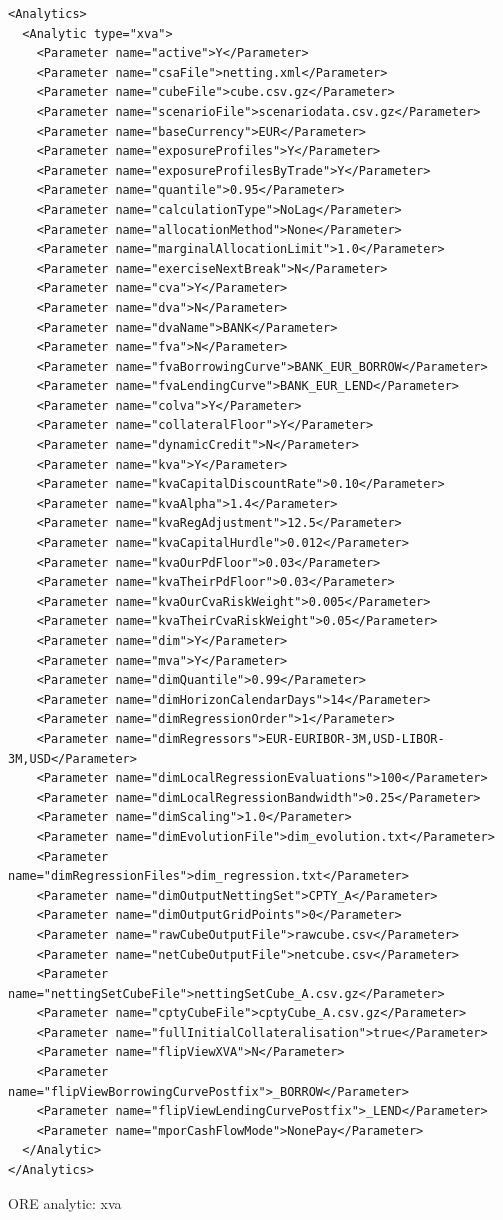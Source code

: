 \documentclass[12pt, a4paper]{article}
\begin{document}
\begin{listing}[H]
\begin{verbatim}
<Analytics>
  <Analytic type="xva">
    <Parameter name="active">Y</Parameter>
    <Parameter name="csaFile">netting.xml</Parameter>
    <Parameter name="cubeFile">cube.csv.gz</Parameter>
    <Parameter name="scenarioFile">scenariodata.csv.gz</Parameter>
    <Parameter name="baseCurrency">EUR</Parameter>
    <Parameter name="exposureProfiles">Y</Parameter>
    <Parameter name="exposureProfilesByTrade">Y</Parameter>
    <Parameter name="quantile">0.95</Parameter>
    <Parameter name="calculationType">NoLag</Parameter>      
    <Parameter name="allocationMethod">None</Parameter>    
    <Parameter name="marginalAllocationLimit">1.0</Parameter>
    <Parameter name="exerciseNextBreak">N</Parameter>
    <Parameter name="cva">Y</Parameter>
    <Parameter name="dva">N</Parameter>
    <Parameter name="dvaName">BANK</Parameter>
    <Parameter name="fva">N</Parameter>
    <Parameter name="fvaBorrowingCurve">BANK_EUR_BORROW</Parameter>
    <Parameter name="fvaLendingCurve">BANK_EUR_LEND</Parameter>
    <Parameter name="colva">Y</Parameter>
    <Parameter name="collateralFloor">Y</Parameter>
    <Parameter name="dynamicCredit">N</Parameter>
    <Parameter name="kva">Y</Parameter>
    <Parameter name="kvaCapitalDiscountRate">0.10</Parameter>
    <Parameter name="kvaAlpha">1.4</Parameter>
    <Parameter name="kvaRegAdjustment">12.5</Parameter>
    <Parameter name="kvaCapitalHurdle">0.012</Parameter>
    <Parameter name="kvaOurPdFloor">0.03</Parameter>
    <Parameter name="kvaTheirPdFloor">0.03</Parameter>
    <Parameter name="kvaOurCvaRiskWeight">0.005</Parameter>
    <Parameter name="kvaTheirCvaRiskWeight">0.05</Parameter>
    <Parameter name="dim">Y</Parameter>
    <Parameter name="mva">Y</Parameter>
    <Parameter name="dimQuantile">0.99</Parameter>
    <Parameter name="dimHorizonCalendarDays">14</Parameter>
    <Parameter name="dimRegressionOrder">1</Parameter>
    <Parameter name="dimRegressors">EUR-EURIBOR-3M,USD-LIBOR-3M,USD</Parameter>
    <Parameter name="dimLocalRegressionEvaluations">100</Parameter>
    <Parameter name="dimLocalRegressionBandwidth">0.25</Parameter>
    <Parameter name="dimScaling">1.0</Parameter>
    <Parameter name="dimEvolutionFile">dim_evolution.txt</Parameter>
    <Parameter name="dimRegressionFiles">dim_regression.txt</Parameter>
    <Parameter name="dimOutputNettingSet">CPTY_A</Parameter>      
    <Parameter name="dimOutputGridPoints">0</Parameter>
    <Parameter name="rawCubeOutputFile">rawcube.csv</Parameter>
    <Parameter name="netCubeOutputFile">netcube.csv</Parameter>
    <Parameter name="nettingSetCubeFile">nettingSetCube_A.csv.gz</Parameter>
    <Parameter name="cptyCubeFile">cptyCube_A.csv.gz</Parameter>
    <Parameter name="fullInitialCollateralisation">true</Parameter>
    <Parameter name="flipViewXVA">N</Parameter>
    <Parameter name="flipViewBorrowingCurvePostfix">_BORROW</Parameter>
    <Parameter name="flipViewLendingCurvePostfix">_LEND</Parameter>
    <Parameter name="mporCashFlowMode">NonePay</Parameter>
  </Analytic>
</Analytics>
\end{verbatim}
\caption{ORE analytic: xva}
\label{lst:ore_xva}
\end{listing}
\end{document}

